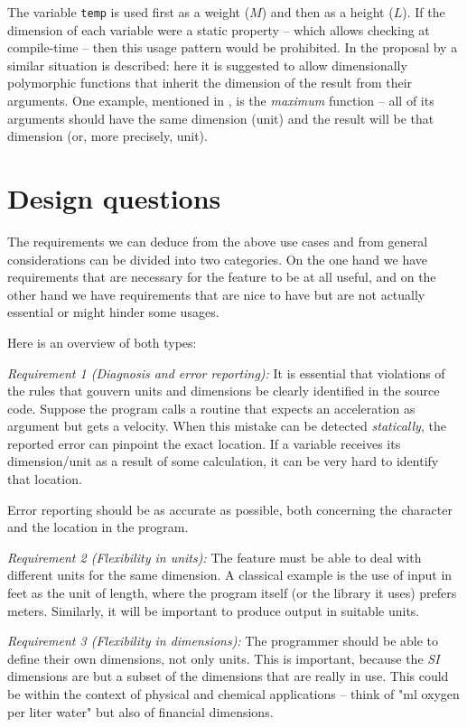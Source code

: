 \documentclass{article}
\begin{document}
The variable \verb+temp+ is used first as a weight ($M$) and then as a height ($L$). If the dimension of each variable were
a static property -- which allows checking at compile-time -- then this usage pattern would be prohibited. In the proposal
by \cite{PhysicalEngineeringUnitsN2113} a similar situation is described: here it is suggested to allow dimensionally polymorphic
functions that inherit the dimension of the result from their arguments. One example, mentioned in \cite{SimConFPTCheckingUnits},
is the \emph{maximum} function -- all of its arguments should have the same dimension (unit) and the result will be that dimension
(or, more precisely, unit).


\section{Design questions}
The requirements we can deduce from the above use cases and from general considerations can be divided
into two categories. On the one hand we have requirements that are necessary for the feature to be at all useful, and
on the other hand we have requirements that are nice to have but are not actually essential or might
hinder some usages.

Here is an overview of both types:

\vspace{\baselineskip}
\noindent \emph{Requirement 1 (Diagnosis and error reporting):}
It is essential that violations of the rules that gouvern units and dimensions be clearly identified in the
source code. Suppose the program calls a routine that expects an acceleration as argument but gets a velocity.
When this mistake can be detected \emph{statically}, the reported error can pinpoint the exact location. If
a variable receives its dimension/unit as a result of some calculation, it can be very hard to identify that
location.

Error reporting should be as accurate as possible, both concerning the character and the location in the program.

\vspace{\baselineskip}
\noindent \emph{Requirement 2 (Flexibility in units):}
The feature must be able to deal with different units for the same dimension. A classical example is the use of
input in feet as the unit of length, where the program itself (or the library it uses) prefers meters. Similarly,
it will be important to produce output in suitable units.

\vspace{\baselineskip}
\noindent \emph{Requirement 3 (Flexibility in dimensions):}
The programmer should be able to define their own dimensions, not only units. This is important, because the \emph{SI}
dimensions are but a subset of the dimensions that are really in use. This could be within the context of
physical and chemical applications -- think of "ml oxygen per liter water" but also of financial dimensions.
\end{document}
